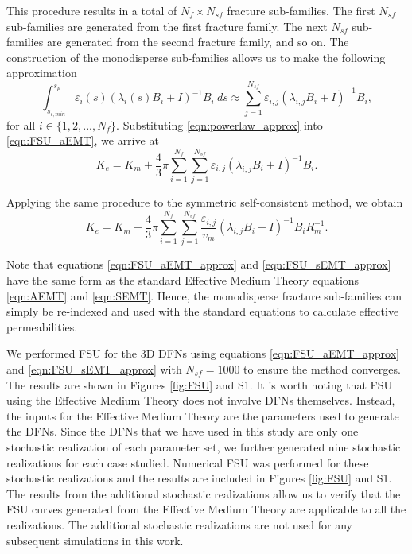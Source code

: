 \documentclass[draft]{agujournal2018}
\begin{document}
This procedure results in a total of $N_f \times N_{sf}$ fracture sub-families. The first $N_{sf}$ sub-families are generated from the first fracture family. The next $N_{sf}$ sub-families are generated from the second fracture family, and so on. The construction of the monodisperse sub-families allows us to make the following approximation
\begin{equation}
\label{eqn:powerlaw_approx}
\int_{s_{i,min}}^{s_p} \varepsilon_i (s) \left(\lambda_i (s) B_i + I\right)^{-1}B_i\ ds 
\approx \sum_{j=1}^{N_{sf}} \varepsilon_{i,j} \left(\lambda_{i,j} B_i + I\right)^{-1}B_i,
\end{equation}
for all $i \in \{1,2,...,N_f\}$. Substituting \ref{eqn:powerlaw_approx} into \ref{eqn:FSU_aEMT}, we arrive at
\begin{equation}
\label{eqn:FSU_aEMT_approx}
K_e =  K_m + \frac{4}{3} \pi \sum_{i=1}^{N_f} \sum_{j=1}^{N_{sf}} \varepsilon_{i,j} \left(\lambda_{i,j} B_i + I\right)^{-1}B_i.
\end{equation}

Applying the same procedure to the symmetric self-consistent method, we obtain
\begin{equation}
\label{eqn:FSU_sEMT_approx}
K_e =  K_m + \frac{4}{3} \pi \sum_{i=1}^{N_f} \sum_{j=1}^{N_{sf}} \frac{\varepsilon_{i,j}}{v_m} \left(\lambda_{i,j} B_i + I\right)^{-1}B_i R_m^{-1}.
\end{equation}

Note that equations \ref{eqn:FSU_aEMT_approx} and \ref{eqn:FSU_sEMT_approx} have the same form as the standard Effective Medium Theory equations \ref{eqn:AEMT} and \ref{eqn:SEMT}. Hence, the monodisperse fracture sub-families can simply be re-indexed and used with the standard equations to calculate effective permeabilities.

We performed FSU for the 3D DFNs using equations \ref{eqn:FSU_aEMT_approx} and \ref{eqn:FSU_sEMT_approx} with $N_{sf}=1000$ to ensure the method converges. The results are shown in Figures \ref{fig:FSU} and S1. It is worth noting that FSU using the Effective Medium Theory does not involve DFNs themselves. Instead, the inputs for the Effective Medium Theory are the parameters used to generate the DFNs. Since the DFNs that we have used in this study are only one stochastic realization of each parameter set, we further generated nine stochastic realizations for each case studied. Numerical FSU was performed for these stochastic realizations and the results are included in Figures \ref{fig:FSU} and S1. The results from the additional stochastic realizations allow us to verify that the FSU curves generated from the Effective Medium Theory are applicable to all the realizations. The additional stochastic realizations are not used for any subsequent simulations in this work.
\end{document}
